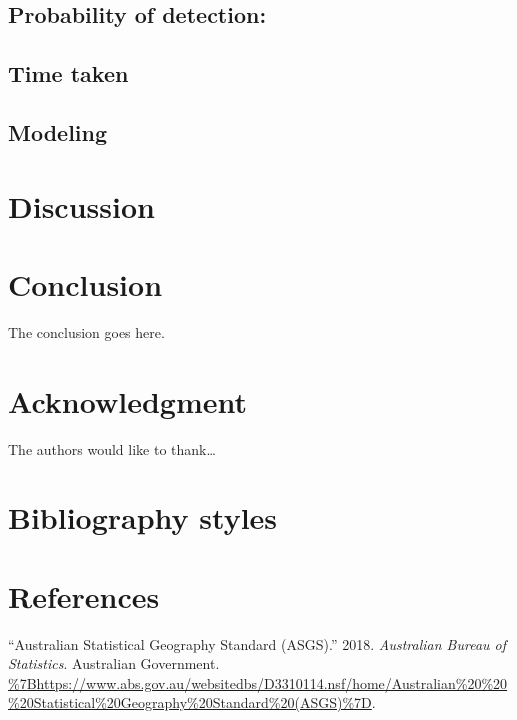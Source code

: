 \documentclass[conference,final,]{IEEEtran}
\begin{document}
\hypertarget{probability-of-detection}{%
\subsection{Probability of detection:}\label{probability-of-detection}}

\hypertarget{time-taken}{%
\subsection{Time taken}\label{time-taken}}

\hypertarget{modeling-1}{%
\subsection{Modeling}\label{modeling-1}}

\hypertarget{discussion}{%
\section{Discussion}\label{discussion}}

\hypertarget{conclusion}{%
\section{Conclusion}\label{conclusion}}

The conclusion goes here.

\hypertarget{acknowledgment}{%
\section{Acknowledgment}\label{acknowledgment}}

The authors would like to thank\ldots{}

\hypertarget{bibliography-styles}{%
\section{Bibliography styles}\label{bibliography-styles}}

\newpage

\hypertarget{references}{%
\section{References}\label{references}}

\hypertarget{refs}{}
\leavevmode\hypertarget{ref-abs2016}{}%
``Australian Statistical Geography Standard (ASGS).'' 2018.
\emph{Australian Bureau of Statistics}. Australian Government.
\url{\%7Bhttps://www.abs.gov.au/websitedbs/D3310114.nsf/home/Australian\%20\%20\%20Statistical\%20Geography\%20Standard\%20(ASGS)\%7D}.
\end{document}
